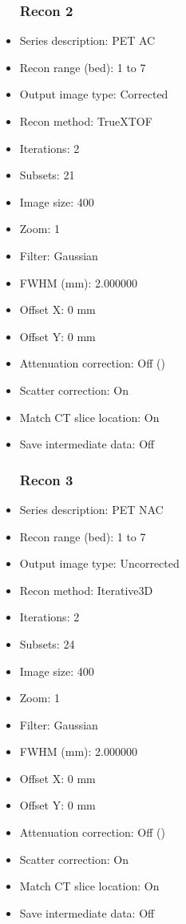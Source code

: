 \documentclass[12pt]{article}
\begin{document}
\begin{itemize}[noitemsep]
\subsubsection{Recon 2}
\item Series description: PET AC
\item Recon range (bed): 1 to 7
\item Output image type: Corrected
\item Recon method: TrueXTOF
\item Iterations: 2
\item Subsets: 21
\item Image size: 400
\item Zoom: 1
\item Filter: Gaussian
\item FWHM (mm): 2.000000
\item Offset X: 0 mm
\item Offset Y: 0 mm
\item Attenuation correction: Off ()
\item Scatter correction: On
\item Match CT slice location: On
\item Save intermediate data: Off
\subsubsection{Recon 3}
\item Series description: PET NAC
\item Recon range (bed): 1 to 7
\item Output image type: Uncorrected
\item Recon method: Iterative3D
\item Iterations: 2
\item Subsets: 24
\item Image size: 400
\item Zoom: 1
\item Filter: Gaussian
\item FWHM (mm): 2.000000
\item Offset X: 0 mm
\item Offset Y: 0 mm
\item Attenuation correction: Off ()
\item Scatter correction: On
\item Match CT slice location: On
\item Save intermediate data: Off
\end{itemize}
\end{document}
